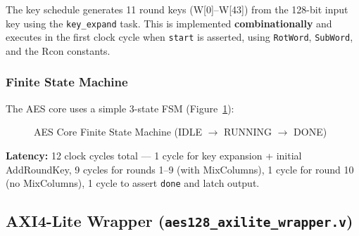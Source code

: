 \documentclass[12pt,a4paper]{article}
\begin{document}
The key schedule generates 11 round keys (W[0]--W[43]) from the 128-bit input key using the \texttt{key\_expand} task. This is implemented \textbf{combinationally} and executes in the first clock cycle when \texttt{start} is asserted, using \texttt{RotWord}, \texttt{SubWord}, and the Rcon constants.

\subsubsection{Finite State Machine}

The AES core uses a simple 3-state FSM (Figure~\ref{fig:fsm_tikz}):

\begin{figure}[H]
\centering
{}
\caption{AES Core Finite State Machine (IDLE $\to$ RUNNING $\to$ DONE)}
\label{fig:fsm_tikz}
\end{figure}

\textbf{Latency:} 12 clock cycles total --- 1 cycle for key expansion + initial AddRoundKey, 9 cycles for rounds 1--9 (with MixColumns), 1 cycle for round 10 (no MixColumns), 1 cycle to assert \texttt{done} and latch output.

\subsection{AXI4-Lite Wrapper (\texttt{aes128\_axilite\_wrapper.v})}
\end{document}

